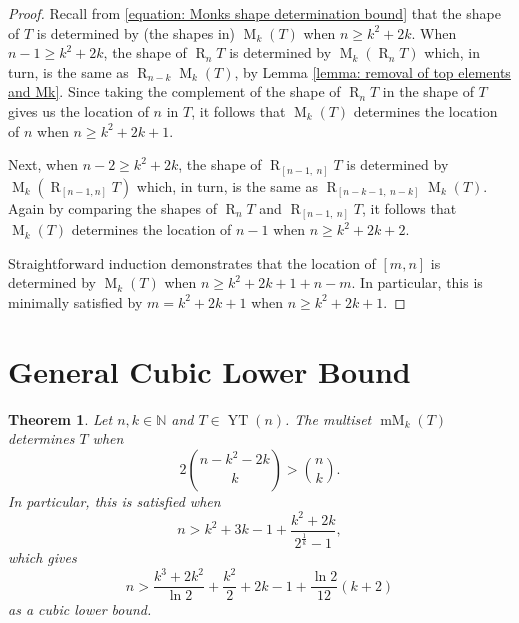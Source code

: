 \documentclass[12pt]{amsart}
\newtheorem{theorem}{Theorem}[section]
\theoremstyle{definition}
\theoremstyle{remark}
\numberwithin{equation}{section}
\numberwithin{figure}{section}
\newcommand{\YT}{\operatorname{YT}}
\newcommand{\M}{\operatorname{M}}
\newcommand{\R}{\operatorname{R}}
\newcommand{\mM}{\operatorname{mM}}
\newcommand{\N}{\mathbb{N}}
\begin{document}
\begin{proof}
    Recall from \eqref{equation: Monks shape determination bound} that the shape of $T$ is determined by (the shapes in) $\M_k(T)$ when $n \geq k^2 + 2k$.
    When $n - 1 \geq k^2 + 2k$, the shape of $\R_n T$ is determined by $\M_k (\R_n T)$ which, in turn, is the same as $\R_{n-k} \M_k(T)$,
    by Lemma \ref{lemma: removal of top elements and Mk}. Since taking the complement of the shape of $\R_n T$ in the shape of $T$ gives us the location of $n$ in $T$, it follows that $\M_k(T)$ determines the location of $n$ when $n \geq k^2 + 2k + 1$.

    Next, when $n - 2 \geq k^2 + 2k$, the shape of $\R_{[n-1, \: n]} T$ is determined by $\M_k (\R_{[n-1, n]} T)$ which, in turn, is the same as $\R_{[n-k-1, \: n-k]} \M_k(T)$. Again by comparing the shapes of $\R_n T$ and $\R_{[n-1,\: n]} T$, it follows that $\M_k(T)$ determines the location of $n-1$ when $n \geq k^2 + 2k + 2$.

    Straightforward induction demonstrates that the location of $[m, n]$ is determined by $\M_k(T)$ when $n \geq k^2 + 2k + 1 + n - m.$ In particular, this is minimally satisfied by $m = k^2 + 2k + 1$ when $n \geq k^2 + 2k + 1.$
\end{proof}






\section{General Cubic Lower Bound}



\begin{theorem} \label{thm: exp lower bound}
    Let $n,k \in \N$ and $T \in \YT(n)$. The multiset $\mM_k(T)$ determines $T$ when
    \begin{equation} \label{eq:4.1}
    2 \binom{n - k^2 -2k}{k} > \binom{n}{k}.
    \end{equation}
    In particular, this is satisfied when
    \[ n > k^2 + 3k - 1+\frac{k^2 + 2k}{2^{\frac{1}{k}} - 1}, \]
    which gives
    \[ n > \frac{k^3+2k^2}{\ln 2}+\frac {k^2}2 +2k-1 + \frac{\ln 2}{12} (k+2) \]
    as a cubic lower bound.
\end{theorem}
\end{document}
